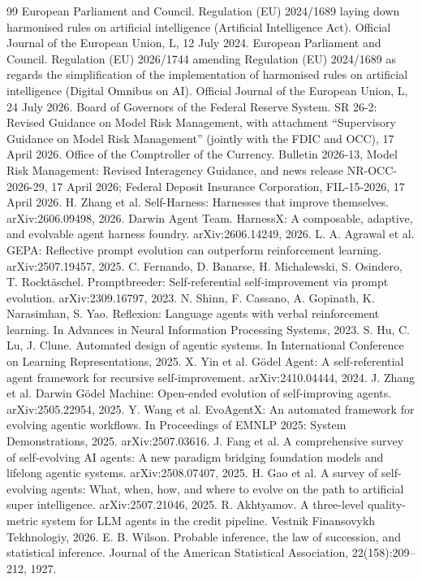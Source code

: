 \documentclass[11pt]{article}
\newif\ifanon
\begin{document}
\begin{thebibliography}{99}
\small
{} European Parliament and Council. Regulation (EU) 2024/1689 laying down harmonised rules on artificial intelligence (Artificial Intelligence Act). Official Journal of the European Union, L, 12 July 2024.
 European Parliament and Council. Regulation (EU) 2026/1744 amending Regulation (EU) 2024/1689 as regards the simplification of the implementation of harmonised rules on artificial intelligence (Digital Omnibus on AI). Official Journal of the European Union, L, 24 July 2026.
 Board of Governors of the Federal Reserve System. SR 26-2: Revised Guidance on Model Risk Management, with attachment ``Supervisory Guidance on Model Risk Management'' (jointly with the FDIC and OCC), 17 April 2026.
 Office of the Comptroller of the Currency. Bulletin 2026-13, Model Risk Management: Revised Interagency Guidance, and news release NR-OCC-2026-29, 17 April 2026; Federal Deposit Insurance Corporation, FIL-15-2026, 17 April 2026.
 H. Zhang et al. Self-Harness: Harnesses that improve themselves. arXiv:2606.09498, 2026.
 Darwin Agent Team. HarnessX: A composable, adaptive, and evolvable agent harness foundry. arXiv:2606.14249, 2026.
 L. A. Agrawal et al. GEPA: Reflective prompt evolution can outperform reinforcement learning. arXiv:2507.19457, 2025.
 C. Fernando, D. Banarse, H. Michalewski, S. Osindero, T. Rockt\"aschel. Promptbreeder: Self-referential self-improvement via prompt evolution. arXiv:2309.16797, 2023.
 N. Shinn, F. Cassano, A. Gopinath, K. Narasimhan, S. Yao. Reflexion: Language agents with verbal reinforcement learning. In Advances in Neural Information Processing Systems, 2023.
 S. Hu, C. Lu, J. Clune. Automated design of agentic systems. In International Conference on Learning Representations, 2025.
 X. Yin et al. G\"odel Agent: A self-referential agent framework for recursive self-improvement. arXiv:2410.04444, 2024.
 J. Zhang et al. Darwin G\"odel Machine: Open-ended evolution of self-improving agents. arXiv:2505.22954, 2025.
 Y. Wang et al. EvoAgentX: An automated framework for evolving agentic workflows. In Proceedings of EMNLP 2025: System Demonstrations, 2025. arXiv:2507.03616.
 J. Fang et al. A comprehensive survey of self-evolving AI agents: A new paradigm bridging foundation models and lifelong agentic systems. arXiv:2508.07407, 2025.
 H. Gao et al. A survey of self-evolving agents: What, when, how, and where to evolve on the path to artificial super intelligence. arXiv:2507.21046, 2025.
 \ifanon Anonymous. A three-level quality-metric system for LLM agents in the credit pipeline, 2026.\else R. Akhtyamov. A three-level quality-metric system for LLM agents in the credit pipeline. Vestnik Finansovykh Tekhnologiy, 2026.\fi
{} E. B. Wilson. Probable inference, the law of succession, and statistical inference. Journal of the American Statistical Association, 22(158):209--212, 1927.
\end{thebibliography}
\end{document}
